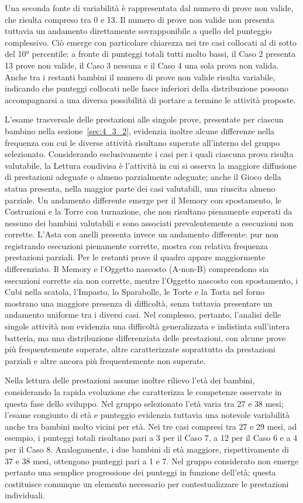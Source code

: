 Una seconda fonte di variabilità è rappresentata dal numero di prove non valide, che risulta compreso tra 0 e 13. Il numero di prove non valide non presenta tuttavia un andamento direttamente sovrapponibile a quello del punteggio complessivo. Ciò emerge con particolare chiarezza nei tre casi collocati al di sotto del 10° percentile: a fronte di punteggi totali tutti molto bassi, il Caso 2 presenta 13 prove non valide, il Caso 3 nessuna e il Caso 4 una sola prova non valida. Anche tra i restanti bambini il numero di prove non valide risulta variabile, indicando che punteggi collocati nelle fasce inferiori della distribuzione possono accompagnarsi a una diversa possibilità di portare a termine le attività proposte.

L'esame trasversale delle prestazioni alle singole prove, presentate per ciascun bambino nella sezione~\ref{sec:4_3_2}, evidenzia inoltre alcune differenze nella frequenza con cui le diverse attività risultano superate all'interno del gruppo selezionato. Considerando esclusivamente i casi per i quali ciascuna prova risulta valutabile, la Lettura condivisa è l'attività in cui si osserva la maggiore diffusione di prestazioni adeguate o almeno parzialmente adeguate; anche il Gioco della statua presenta, nella maggior parte dei casi valutabili, una riuscita almeno parziale. Un andamento differente emerge per il Memory con spostamento, le Costruzioni e la Torre con turnazione, che non risultano pienamente superati da nessuno dei bambini valutabili e sono associati prevalentemente a esecuzioni non corrette. L'Asta con anelli presenta invece un andamento differente: pur non registrando esecuzioni pienamente corrette, mostra con relativa frequenza prestazioni parziali. Per le restanti prove il quadro appare maggiormente differenziato. Il Memory e l'Oggetto nascosto (A-non-B) comprendono sia esecuzioni corrette sia non corrette, mentre l'Oggetto nascosto con spostamento, i Cubi nella scatola, l'Impasto, lo Sparabolle, le Torte e la Torta nel forno mostrano una maggiore presenza di difficoltà, senza tuttavia presentare un andamento uniforme tra i diversi casi. Nel complesso, pertanto, l'analisi delle singole attività non evidenzia una difficoltà generalizzata e indistinta sull'intera batteria, ma una distribuzione differenziata delle prestazioni, con alcune prove più frequentemente superate, altre caratterizzate soprattutto da prestazioni parziali e altre ancora più frequentemente non superate. 

Nella lettura delle prestazioni assume inoltre rilievo l'età dei bambini, considerando la rapida evoluzione che caratterizza le competenze osservate in questa fase dello sviluppo. Nel gruppo selezionato l'età varia tra 27 e 38 mesi; l'esame congiunto di età e punteggio evidenzia tuttavia una notevole variabilità anche tra bambini molto vicini per età. Nei tre casi compresi tra 27 e 29 mesi, ad esempio, i punteggi totali risultano pari a 3 per il Caso 7, a 12 per il Caso 6 e a 4 per il Caso 8. Analogamente, i due bambini di età maggiore, rispettivamente di 37 e 38 mesi, ottengono punteggi pari a 1 e 7. Nel gruppo considerato non emerge pertanto una semplice progressione dei punteggi in funzione dell'età; questa costituisce comunque un elemento necessario per contestualizzare le prestazioni individuali.

